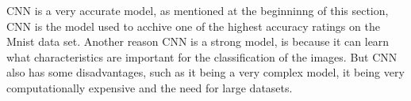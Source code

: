 CNN is a very accurate model, as mentioned at the beginninng of this section, CNN is the model used to acchive one of the highest accuracy ratings on the Mnist data set\cite{MnistStatictics}. Another reason CNN is a strong model, is because it can learn what characteristics are important for the classification of the images\cite{CNNProsAndCons}. But CNN also has some disadvantages, such as it being a very complex model, it being very computationally expensive and the need for large datasets.





